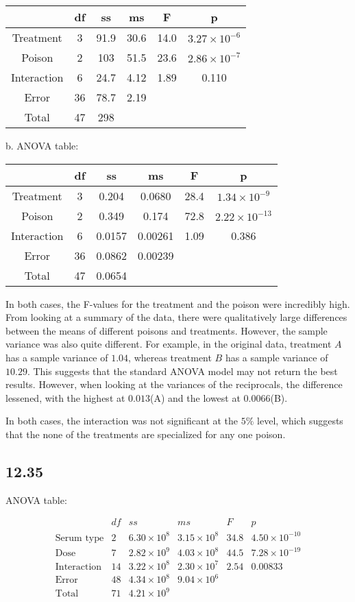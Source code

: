 \documentclass{article}
\begin{document}
\begin{tabular}{cccccc}
&df&ss&ms&F&p\\
\hline
Treatment&3&91.9&30.6&14.0&$3.27\times10^{-6}$\\
Poison&2&103&51.5&23.6&$2.86\times10^{-7}$\\
Interaction&6&24.7&4.12&1.89&0.110\\
Error&36&78.7&2.19\\
Total&47&298\\
\end{tabular}

b. ANOVA table:

\begin{tabular}{cccccc}
&df&ss&ms&F&p\\
\hline
Treatment&3&0.204&0.0680&28.4&$1.34\times10^{-9}$\\
Poison&2&0.349&0.174&72.8&$2.22\times10^{-13}$\\
Interaction&6&0.0157&0.00261&1.09&0.386\\
Error&36&0.0862&0.00239\\
Total&47&0.0654\\
\end{tabular}

In both cases, the F-values for the treatment and the poison were incredibly high. From looking at a summary of the data, there were qualitatively large differences between the means of different poisons and treatments. However, the sample variance was also quite different. For example, in the original data, treatment $A$ has a sample variance of $1.04$, whereas treatment $B$ has a sample variance of $10.29$. This suggests that the standard ANOVA model may not return the best results. However, when looking at the variances of the reciprocals, the difference lessened, with the highest at $0.013$(A) and the lowest at $0.0066$(B). 

In both cases, the interaction was not significant at the $5\%$ level, which suggests that the none of the treatments are specialized for any one poison.
\subsection*{12.35}
ANOVA table:

$$\begin{array}{c|ccccc}
&df&ss&ms&F&p\\
\hline
\text{Serum type}&2&6.30\times10^8&3.15\times10^8&34.8&4.50\times10^{-10}\\
\text{Dose}&7&2.82\times10^9&4.03\times10^8&44.5&7.28\times10^{-19}\\
\text{Interaction}&14&3.22\times10^8&2.30\times10^7&2.54&0.00833\\
\text{Error}&48&4.34\times10^8&9.04\times10^6\\
\text{Total}&71&4.21\times10^9\\
\end{array}$$
\end{document}
